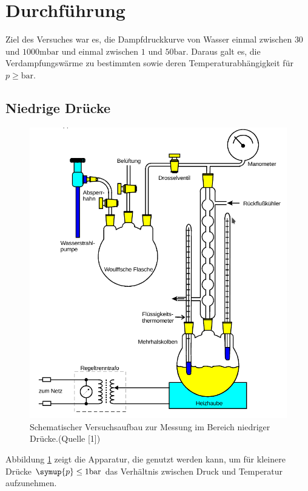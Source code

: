 

\section{Durchführung}
\label{sec:Durchführung}
Ziel des Versuches war es, die Dampfdruckkurve von Wasser einmal zwischen $30$ und $1000 \si{\milli\bar}$
und einmal zwischen $1$ und $50 \si{\bar}$. Daraus galt es, die Verdampfungswärme zu bestimmten
sowie deren Temperaturabhängigkeit für $p \geq \si{\bar}$.

\subsection{Niedrige Drücke}
\begin{figure}
    \centering
    \includegraphics[width=\textwidth]{apparatur1.png}
    \caption{Schematischer Versuchsaufbau zur Messung im Bereich niedriger Drücke.(Quelle [1])}
    \label{fig:app1}
\end{figure}
\noindent Abbildung \ref{fig:app1} zeigt die Apparatur, die genutzt werden kann, um für kleinere Drücke $\symup{p} \leq 1 \si{\bar}$
das Verhältnis zwischen Druck und Temperatur aufzunehmen. \\
